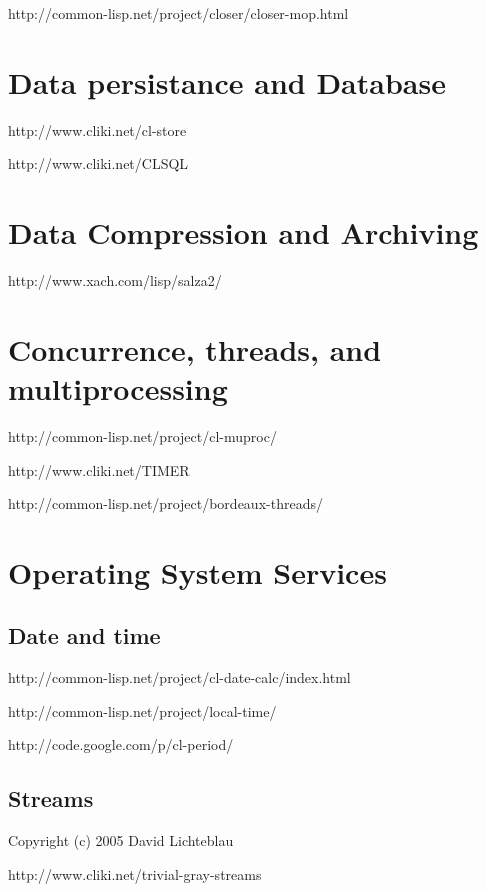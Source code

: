 \documentclass[10pt,english]{book}
\begin{document}
http://common-lisp.net/project/closer/closer-mop.html



\chapter{Data persistance and Database}
\label{cha:data-persistance}

http://www.cliki.net/cl-store

http://www.cliki.net/CLSQL



\chapter{Data Compression and Archiving}
\label{cha:data-compr-arch}

http://www.xach.com/lisp/salza2/



\chapter{Concurrence, threads, and multiprocessing}
\label{cha:conc-thre-mult}

http://common-lisp.net/project/cl-muproc/

http://www.cliki.net/TIMER

http://common-lisp.net/project/bordeaux-threads/


\chapter{Operating System Services}
\label{cha:oper-syst-serv}

\section{Date and time}
\label{sec:date-time}

http://common-lisp.net/project/cl-date-calc/index.html

http://common-lisp.net/project/local-time/

http://code.google.com/p/cl-period/

\section{Streams}
\label{sec:streams-1}

Copyright (c) 2005 David Lichteblau

http://www.cliki.net/trivial-gray-streams
\end{document}
